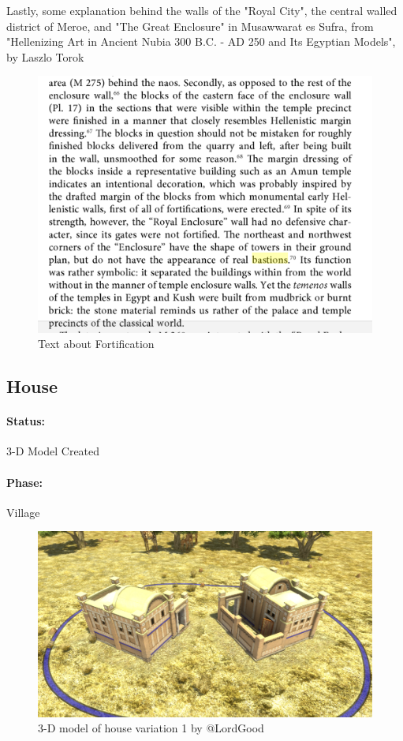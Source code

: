 \documentclass[a4paper,12pt]{scrreprt}
\begin{document}
Lastly, some explanation behind the walls of the "Royal City", the central walled district of Meroe, and "The Great Enclosure" in Musawwarat es Sufra, from "Hellenizing Art in Ancient Nubia 300 B.C. - AD 250 and Its Egyptian Models", by Laszlo Torok  

\begin{figure}[H]
	\centering
	\includegraphics[width=\textwidth]{img/fortress/text_fortification}
	\caption{Text about Fortification}
\end{figure}

\subsection{House}

\paragraph{Status:} 3-D Model Created\\
\paragraph{Phase:} Village\\

\begin{figure}[H]
	\centering
	\includegraphics[width=\textwidth]{img/house/house_variation1}
	\caption{3-D model of house variation 1 by @LordGood}
\end{figure}
\end{document}
